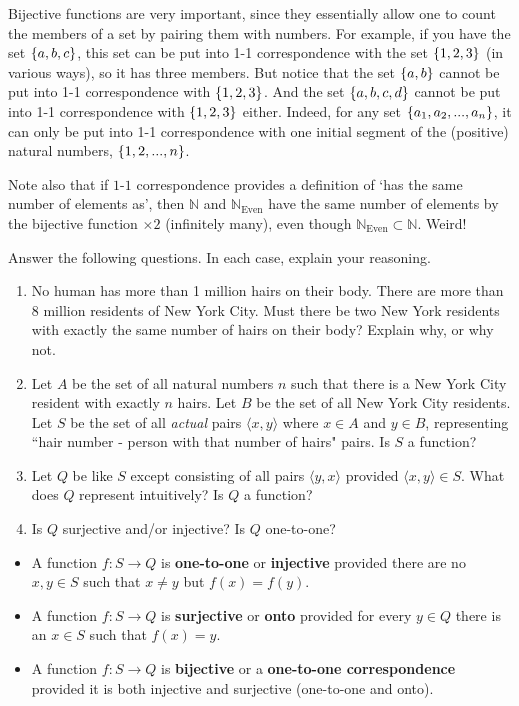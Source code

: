 Bijective functions are very important, since they essentially allow one to count the members of a set by pairing them with numbers. For example, if you have the set $\{a, b, c\}$, this set can be put into 1-1 correspondence with the set $\{1, 2, 3\}$ (in various ways), so it has three members. But notice that the set $\{a, b\}$ cannot be put into 1-1 correspondence with $\{1, 2, 3\}$. And the set $\{a, b, c, d\}$ cannot be put into 1-1 correspondence with $\{1, 2, 3\}$ either. Indeed, for any set $\{a_1, a_2, ..., a_n\}$, it can only be put into 1-1 correspondence with one initial segment of the (positive) natural numbers, $\{1, 2, ..., n\}$. 

Note also that if $1$-$1$ correspondence provides a definition of `has the same number of elements as', then $\mathbb{N}$ and $\mathbb{N}_\text{Even}$ have the same number of elements by the bijective function $\times 2$ (infinitely many), even though $\mathbb{N}_\text{Even} \subset \mathbb{N}$. Weird!

\begin{exc}
	Answer the following questions. In each case, explain your reasoning. 
\begin{enumerate}
	\item No human has more than 1 million hairs on their body. There are more than 8 million residents of New York City. Must there be two New York residents with exactly the same number of hairs on their body? Explain why, or why not. 
	\item Let $A$ be the set of all natural numbers $n$ such that there is a New York City resident with exactly $n$ hairs. Let $B$ be the set of all New York City residents. Let $S$ be the set of all \textit{actual} pairs $\langle x, y \rangle$ where $x \in A$ and $y \in B$, representing ``hair number - person with that number of hairs" pairs. Is $S$ a function?  
	\item Let $Q$ be like $S$ except consisting of all pairs $\langle y, x \rangle$ provided $\langle x, y \rangle \in S$. What does $Q$ represent intuitively? Is $Q$ a function? 
	\item Is $Q$ surjective and/or injective? Is $Q$ one-to-one? 
\end{enumerate}
\end{exc}

\begin{defn} \leavevmode
\begin{itemize} 
\item A function $f: S \to Q$ is \textbf{one-to-one} or \textbf{injective} provided there are no $x, y \in S$ such that $x \neq y$ but $f(x)=f(y)$. 
\item A function $f: S \to Q$ is \textbf{surjective} or \textbf{onto} provided for every $y \in Q$ there is an $x \in S$ such that $f(x)=y$. 
\item A function $f: S \to Q$ is \textbf{bijective} or a \textbf{one-to-one correspondence} provided it is both injective and surjective (one-to-one and onto). 
\end{itemize}
\end{defn}

